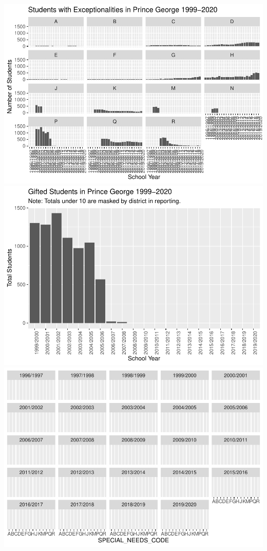\documentclass[
  english,
  man,floatsintext]{apa6}
\begin{document}
\includegraphics{Final_project_files/figure-latex/rural play-1.pdf} \includegraphics{Final_project_files/figure-latex/rural play-2.pdf} \includegraphics{Final_project_files/figure-latex/rural play-3.pdf}
\end{document}
